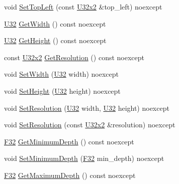 \begin{DoxyCompactItemize}
\item 
void \hyperlink{classmage_1_1rendering_1_1_viewport_a22ea70a6e01b8328ba94d90e374e85cb}{Set\+Top\+Left} (const \hyperlink{namespacemage_a88e05bff0300120c013285d3dcad95c5}{U32x2} \&top\+\_\+left) noexcept
\item 
\hyperlink{namespacemage_a41c104c036fba3756a74e19f793eeaa1}{U32} \hyperlink{classmage_1_1rendering_1_1_viewport_a757409f525af58308a58083a9d9e086d}{Get\+Width} () const noexcept
\item 
\hyperlink{namespacemage_a41c104c036fba3756a74e19f793eeaa1}{U32} \hyperlink{classmage_1_1rendering_1_1_viewport_a89247ccb96e4e018d66ad6b5416cd039}{Get\+Height} () const noexcept
\item 
const \hyperlink{namespacemage_a88e05bff0300120c013285d3dcad95c5}{U32x2} \hyperlink{classmage_1_1rendering_1_1_viewport_aed4861d214f2c1e62d84fd4c81b6aa13}{Get\+Resolution} () const noexcept
\item 
void \hyperlink{classmage_1_1rendering_1_1_viewport_abe04695a284b6a00e2f585c0fe7f6e90}{Set\+Width} (\hyperlink{namespacemage_a41c104c036fba3756a74e19f793eeaa1}{U32} width) noexcept
\item 
void \hyperlink{classmage_1_1rendering_1_1_viewport_aeec860b52dc9b3b703935ff94e2a3c47}{Set\+Height} (\hyperlink{namespacemage_a41c104c036fba3756a74e19f793eeaa1}{U32} height) noexcept
\item 
void \hyperlink{classmage_1_1rendering_1_1_viewport_a47894b9c1fb70c81a1b881fa807b89eb}{Set\+Resolution} (\hyperlink{namespacemage_a41c104c036fba3756a74e19f793eeaa1}{U32} width, \hyperlink{namespacemage_a41c104c036fba3756a74e19f793eeaa1}{U32} height) noexcept
\item 
void \hyperlink{classmage_1_1rendering_1_1_viewport_ada6ffe820ed4dec4ff0dbee2fb43e4e8}{Set\+Resolution} (const \hyperlink{namespacemage_a88e05bff0300120c013285d3dcad95c5}{U32x2} \&resolution) noexcept
\item 
\hyperlink{namespacemage_aa97e833b45f06d60a0a9c4fc22ae02c0}{F32} \hyperlink{classmage_1_1rendering_1_1_viewport_ace36e941f271c9455a9d947b124d45da}{Get\+Minimum\+Depth} () const noexcept
\item 
void \hyperlink{classmage_1_1rendering_1_1_viewport_a5148b28315b8426ba5d26a8c76b39cad}{Set\+Minimum\+Depth} (\hyperlink{namespacemage_aa97e833b45f06d60a0a9c4fc22ae02c0}{F32} min\+\_\+depth) noexcept
\item 
\hyperlink{namespacemage_aa97e833b45f06d60a0a9c4fc22ae02c0}{F32} \hyperlink{classmage_1_1rendering_1_1_viewport_a6be40c90f5435cf04f35d673565f91e7}{Get\+Maximum\+Depth} () const noexcept

\end{DoxyCompactItemize}
